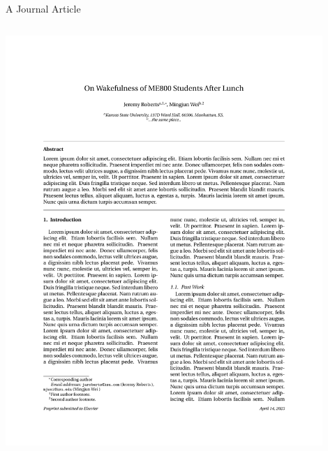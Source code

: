 \documentclass[aspectratio=1610]{beamer}
\let\oldfootnotesize\footnotesize
\renewcommand*{\footnotesize}{\oldfootnotesize\tiny}
\begin{document}
\begin{frame}[fragile]{A Journal Article}
  \begin{columns}[T]


      \vspace{-5pt}

      



      \includegraphics[width=0.9\textwidth, frame]{example_journal.pdf}

  \end{columns}
\end{frame}
\end{document}
